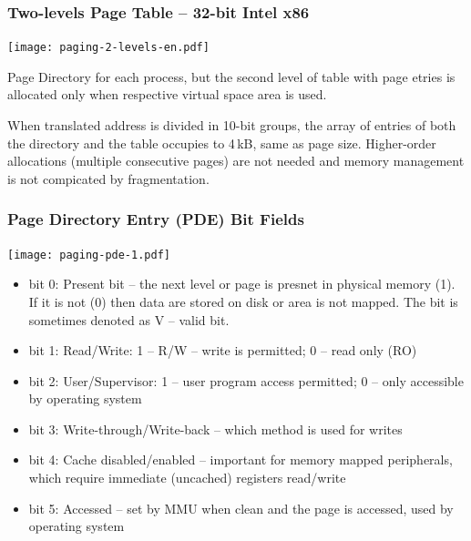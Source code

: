 \documentclass{beamer}
\begin{document}
\begin{frame}
\frametitle{Two-levels Page Table -- 32-bit Intel x86}

{
\centering

\texttt{[image: paging-2-levels-en.pdf]}

}

Page Directory for each process, but the second level of table with page etries is allocated only when respective virtual space area is used.

\smallskip

When translated address is divided in 10-bit groups, the array of entries
of both the directory and the table occupies to 4\,kB, same as page size. Higher-order allocations
(multiple consecutive pages) are not needed and memory management is not compicated by fragmentation.

\end{frame}

\begin{frame}
\frametitle{\textbf{Page Directory Entry} (PDE) Bit Fields}

{
\centering

\texttt{[image: paging-pde-1.pdf]}

}

\vskip 2mm

\begin{itemize}
\item bit 0: Present bit -- the next level or page is presnet in physical memory (1). If it is not (0) then data are stored on disk or area is not mapped. The bit is sometimes denoted as V -- valid bit.
\item bit 1: Read/Write: 1 -- R/W -- write is permitted; 0 -- read only (RO)
\item bit 2: User/Supervisor: 1 -- user program access permitted; 0 -- only accessible by operating system
\item bit 3: Write-through/Write-back -- which method is used for writes
\item bit 4: Cache disabled/enabled -- important for memory mapped peripherals, which require immediate (uncached) registers read/write 
\item bit 5: Accessed -- set by MMU when clean and the page is accessed, used by operating system
\end{itemize}

\end{frame}
\end{document}
